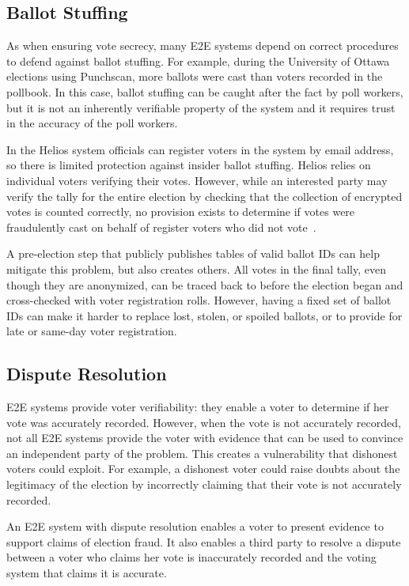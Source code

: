 \subsection{Ballot Stuffing}

As when ensuring vote secrecy, many E2E systems depend on correct
procedures to defend against ballot stuffing. For example, during the
University of Ottawa elections using Punchscan, more ballots were cast
than voters recorded in the pollbook. In this case, ballot stuffing
can be caught after the fact by poll workers, but it is not an
inherently verifiable property of the system and it requires trust in
the accuracy of the poll workers.

In the Helios system officials can register voters in the system by
email address, so there is limited protection against insider ballot
stuffing. Helios relies on individual voters verifying their
votes. However, while an interested party may verify the tally for the
entire election by checking that the collection of encrypted votes is
counted correctly, no provision exists to determine if votes were
fraudulently cast on behalf of register voters who did not
vote~\cite{orion2009}.

A pre-election step that publicly publishes tables of valid ballot IDs
can help mitigate this problem, but also creates others. All votes in
the final tally, even though they are anonymized, can be traced back
to before the election began and cross-checked with voter registration
rolls. However, having a fixed set of ballot IDs can make it harder to
replace lost, stolen, or spoiled ballots, or to provide for late or
same-day voter registration.

\subsection{Dispute Resolution}

E2E systems provide voter verifiability: they enable a voter to
determine if her vote was accurately recorded. However, when the vote
is not accurately recorded, not all E2E systems provide the voter with
evidence that can be used to convince an independent party of the
problem. This creates a vulnerability that dishonest voters could
exploit. For example, a dishonest voter could raise doubts about the
legitimacy of the election by incorrectly claiming that their vote is
not accurately recorded.

An E2E system with dispute resolution enables a voter to present
evidence to support claims of election fraud. It also enables a third
party to resolve a dispute between a voter who claims her vote is
inaccurately recorded and the voting system that claims it is accurate.

